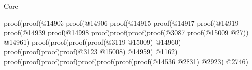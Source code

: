 \begin{lexlean}{Core}
\begin{coremodule}
                                                                        proof(proof(@14903
                                                                              proof(@14906
                                                                                  proof(@14915
                                                                                      proof(@14917
                                                                                          proof(@14919
                                                                                              proof(@14939
                                                                                                  proof(@14998
                                                                                                      proof(proof(proof(proof(@3087
                                                                                                                proof(@15009
                                                                                                                    @27))
                                                                                                              @14961)
                                                                                                            proof(proof(proof(proof(@3119
                                                                                                                      @15009)
                                                                                                                    @14960)
                                                                                                                  proof(proof(proof(proof(@3123
                                                                                                                            @15008)
                                                                                                                          @14959)
                                                                                                                        @1162)
                                                                                                                      proof(proof(proof(proof(proof(proof(proof(proof(@14536
                                                                                                                                        @2831)
                                                                                                                                      @2923)
                                                                                                                                    @2746)

\end{coremodule}
\end{lexlean}
